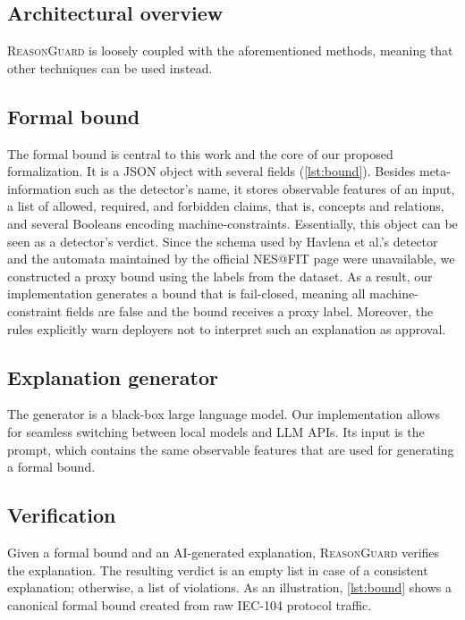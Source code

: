\documentclass[conference]{IEEEtran}
\newcommand{\rg}{\textsc{ReasonGuard}}
\begin{document}
\subsection{Architectural overview}
\rg{} is loosely coupled with the aforementioned methods, meaning that other techniques can be used instead.

\subsection{Formal bound}
The formal bound is central to this work and the core of our proposed formalization. It is a JSON object with several fields (\cref{lst:bound}). Besides meta-information such as the detector's name, it stores observable features of an input, a list of allowed, required, and forbidden claims, that is, concepts and relations, and several Booleans encoding machine-constraints. Essentially, this object can be seen as a detector's verdict. Since the schema used by Havlena et al.'s detector~\cite{HavlenaMatousekRysavyHolik2023} and the automata maintained by the official NES@FIT page were unavailable, we constructed a proxy bound using the labels from the dataset. As a result, our implementation generates a bound that is fail-closed, meaning all machine-constraint fields are false and the bound receives a proxy label. Moreover, the rules explicitly warn deployers not to interpret such an explanation as approval.

\subsection{Explanation generator}
The generator is a black-box large language model. Our implementation allows for seamless switching between local models and LLM APIs. Its input is the prompt, which contains the same observable features that are used for generating a formal bound.

\subsection{Verification}
Given a formal bound and an AI-generated explanation, \rg{} verifies the explanation. The resulting verdict is an empty list in case of a consistent explanation; otherwise, a list of violations. As an illustration, \cref{lst:bound} shows a canonical formal bound created from raw IEC-104 protocol traffic.


\end{document}
